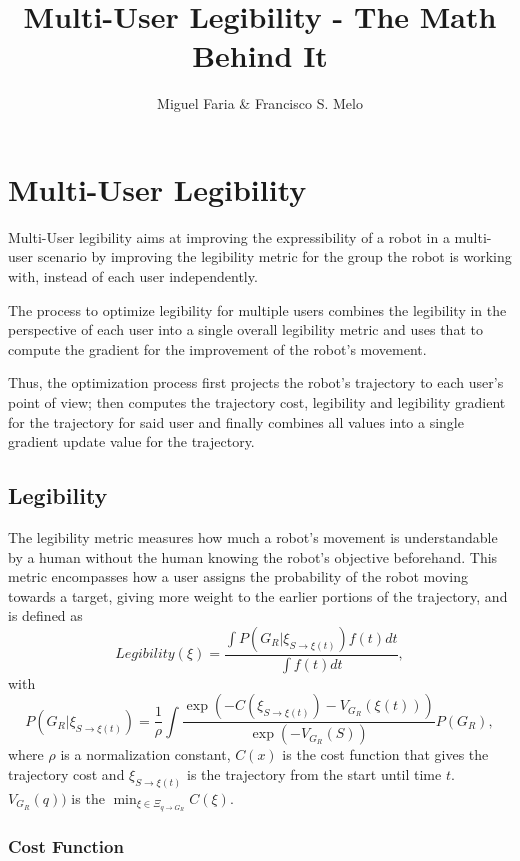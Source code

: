 \documentclass[a4paper,11pt,times,doublespace]{article}
\title{Multi-User Legibility - The Math Behind It}
\author{Miguel Faria \& Francisco S. Melo}
\begin{document}
	
\maketitle
		
\section{Multi-User Legibility}

Multi-User legibility aims at improving the expressibility of a robot in a multi-user scenario by improving the legibility metric for the group the robot is working with, instead of each user independently.

The process to optimize legibility for multiple users combines the legibility in the perspective of each user into a single overall legibility metric and uses that to compute the gradient for the improvement of the robot's movement.

Thus, the optimization process first projects the robot's trajectory to each user's point of view; then computes the trajectory cost, legibility and legibility gradient for the trajectory for said user and finally combines all values into a single gradient update value for the trajectory.

\subsection{Legibility}

The legibility metric measures how much a robot's movement is understandable by a human without the human knowing the robot's objective beforehand. This metric encompasses how a user assigns the probability of the robot moving towards a target, giving more weight to the earlier portions of the trajectory, and is defined as
%
\begin{equation*}
	Legibility(\xi) = \frac{\int P(G_R|\xi_{S\to\xi(t)})f(t)dt}{\int f(t) dt},
\end{equation*}
%
with
%
\begin{equation*}
	P(G_R|\xi_{S\to\xi(t)}) = \frac{1}{\rho} \int \frac{\exp(-C(\xi_{S\to\xi(t)}) - V_{G_R}(\xi(t)))}{\exp(-V_{G_R}(S))} P(G_R),
\end{equation*}
%
where $\rho$ is a normalization constant, $C(x)$ is the cost function that gives the trajectory cost and $\xi_{S\to\xi(t)}$ is the trajectory from the start until time $t$. $V_{G_R}(q))$ is the $\min_{\xi \in \Xi_{q \rightarrow G_R}} C(\xi)$.

\subsubsection{Cost Function}
\end{document}
